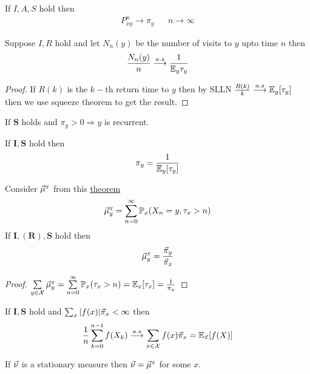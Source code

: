 \documentclass[12pt,a4paper]{article}
\begin{document}
\begin{thm}\label{convthm}
    If $I,A,S$ hold then 
    \begin{align*}
        P_{xy}^n \to \pi_y && n\to \infty
    \end{align*}
\end{thm}
\begin{thm}\label{asymfreq}
    Suppose $I,R$ hold and let $N_n(y)$ be the number of visits to $y$ upto time $n$ then 
    \begin{align*}
        \frac{N_n(y)}{n} \overset{a.s}{\longrightarrow} \frac{1}{\mathbb{E}_y \tau_y}
    \end{align*} 
\end{thm}
\begin{proof}
    If $R(k)$ is the $k-$th return time to $y$ then by SLLN $\frac{R(k)}{k} \overset{a.s}{\longrightarrow} \mathbb{E}_y[\tau_y]$ then we use squeeze theorem to get the result.   
\end{proof}
\newpage
\begin{lemma}
    If $\mathbf{S}$ holds and $\pi_y > 0 \Rightarrow y$ is recurrent. 
\end{lemma}

\begin{thm}\label{uniquedist}
    If $\mathbf{I}, \mathbf{S}$ hold then 
    \begin{align*}
        \pi_y = \frac{1}{\mathbb{E}_y[\tau_y]}
    \end{align*}
\end{thm}

\begin{thm}[]\label{thm611}
    Consider $\va\mu^x$ from this \hyperref[thm411]{theorem}
    \begin{align*}
        \va\mu^x_y = \sum\limits_{n=0}^{\infty} \mathbb{P}_x(X_n=y, \tau_x > n)
    \end{align*}
    If $\mathbf{I}, (\mathbf{R}), \mathbf{S}$ hold then 
    \begin{align*}
        \va\mu^x_y  = \frac{\va\pi_y}{\va\pi_x}
    \end{align*} 
\end{thm}
\begin{proof}
    $\sum\limits_{y\in \mathcal{X}}^{}\va\mu_y^x = \sum\limits_{n=0}^{\infty}\mathbb{P}_x(\tau_x > n) = \mathbb{E}_x[\tau_x] = \frac{1}{\pi_y}$
\end{proof}
\begin{thm}\label{expfun}
    If $\mathbf{I}, \mathbf{S}$ hold and $\sum_x |f(x)|\va\pi_x < \infty$ then 
    \begin{align*}
        \frac{1}{n}\sum\limits_{k=0}^{n-1}f(X_k) \overset{a.s}{\longrightarrow} \sum\limits_{x\in \mathcal{X}}^{}f(x)\va\pi_x = \mathbb{E}_{\va\pi}[f(X)]
    \end{align*}
\end{thm}
\begin{thm}
    If $\va\nu$ is a stationary measure then $\va\nu = \va\mu^x$ for some $x$. 
\end{thm}
\newpage
\end{document}
